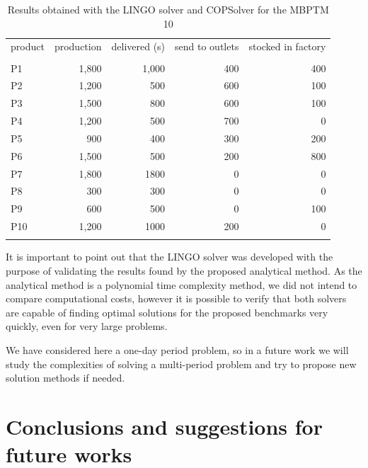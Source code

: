 \documentclass[authoryear,manuscript,12pt]{elsarticle}
\begin{document}
\begin{table}[h]
\begin{center}
\begin{footnotesize}
\begin{tabular}[c]{l r r r r}
product & production & delivered (s) & send to outlets & stocked in factory \\
\cline {1-5} \\
P1 & 1,800 & 1,000 & 400 & 400 \\
P2 & 1,200 & 500 & 600 & 100 \\
P3 & 1,500 & 800 & 600 & 100 \\
P4 & 1,200 & 500 & 700 & 0 \\
P5 & 900 & 400 & 300 & 200 \\
P6 & 1,500 & 500 & 200 & 800 \\
P7 & 1,800 & 1800 & 0 & 0 \\
P8 & 300 & 300 & 0 & 0 \\
P9 & 600 & 500 & 0 & 100 \\
P10 & 1,200 & 1000 & 200 & 0 \\
\cline {1-5} \\
\end{tabular}
\caption{Results obtained with the LINGO solver and COPSolver for the MBPTM 10}
\label{tab:compResultsMBPTMP3}
\end{footnotesize}
\end{center}
\end{table}

It is important to point out that the LINGO solver was developed with the purpose of validating the results found by the proposed analytical method. As the analytical method is a polynomial time complexity method, we did not intend to compare computational costs, however it is possible to verify that both solvers are capable of finding optimal solutions for the proposed benchmarks very quickly, even for very large problems.

We have considered here a one-day period problem, so in a future work we will study the complexities of solving a multi-period problem and try to propose new solution methods if needed. 

\section{Conclusions and suggestions for future works}
\label{sec:conclusions}
\end{document}

